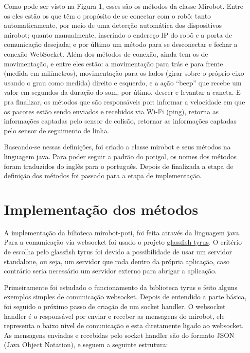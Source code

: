 Como pode ser visto na Figura 1, esses são os métodos da classe Mirobot. Entre
os eles estão os que têm o propósito de se conectar com o robô: tanto
automaticamente, por meio de uma detecção automática dos dispositivos mirobot;
quanto manualmente, inserindo o endereço IP do robô e a porta de comunicação
desejada; e por último um método para se desconectar e fechar a conexão
WebSocket. Além dos métodos de conexão, ainda tem os de movimentação, e entre
eles estão: a movimentação para trás e para frente (medida em milímetros),
movimentação para os lados (girar sobre o próprio eixo usando o grau como
medida) direito e esquerdo, e a ação ``beep'' que recebe um valor em segundos
da duração do som, por útimo, descer e levantar a caneta. E pra finalizar, os
métodos que são responsáveis por: informar a velocidade em que os pacotes estão
sendo enviados e recebidos via Wi-Fi (ping), retorna as informações captadas
pelo sensor de colisão, retornar as informações captadas pelo sensor de
seguimento de linha.

Baseando-se nessas definições, foi criado a classe mirobot e seus métodos na
linguagem java. Para poder seguir a padrão do potigol, os nomes dos métodos
foram traduzidos do inglês para o português. Depois de finalizada a etapa de
definição dos métodos foi passado para a etapa de implementação. 

\section{Implementação dos métodos}
\label{sec:implementacao}

A implementação da bilioteca mirobot-poti, foi feita através da linguagem java.
Para a comunicação via websocket foi usado o projeto
\href{https://tyrus.java.net/}{glassfish tyrus}. O critério de escolha pelo
glassfish tyrus foi devido a possibilidade de usar um servidor standalone, ou
seja, um servidor que roda dentro da própria aplicação, caso contrário seria
necessário um servidor externo para abrigar a aplicação. 

Primeiramente foi estudado o funcionamento da biblioteca tyrus e feito alguns
exemplos simples de comunicação websocket. Depois de entendido a parte básica,
foi seguido o próximo passo de criação de um socket handler. O websocket
handler é o responsável por enviar e receber as mensagens do mirobot, ele
representa o baixo nível de comunicação e esta diretamente ligado ao websocket.
As mensagens enviadas e recebidas pelo socket handler são do formato JSON (Java
Object Notation), e seguem a seguinte estrutura:

